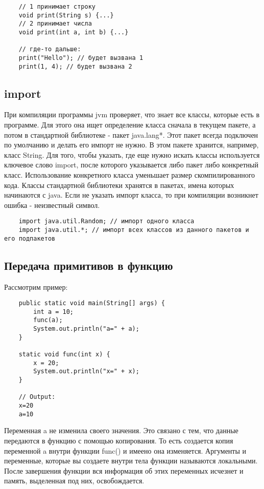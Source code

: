 \begin{lstlisting}
	// 1 принимает строку
	void print(String s) {...}
	// 2 принимает числа
	void print(int a, int b) {...}

	// где-то дальше:
	print("Hello"); // будет вызвана 1
	print(1, 4); // будет вызвана 2
\end{lstlisting}

\subsection*{import}
При компиляции программы jvm проверяет, что знает все классы, которые есть в программе. Для этого она ищет определение класса сначала в текущем пакете, а потом в стандартной библиотеке - пакет java.lang*. Этот пакет всегда подключен по умолчанию и делать его импорт не нужно. В этом пакете хранится, например, класс String.
Для того, чтобы указать, где еще нужно искать классы используется ключевое слово import, после которого указывается либо пакет либо конкретный класс. Использование конкретного класса уменьшает размер скомпилированного кода. Классы стандартной библиотеки хранятся в пакетах, имена которых начинаются с java. Если не указать импорт класса, то при компиляции возникнет ошибка - неизвестный символ.

\begin{lstlisting}
	import java.util.Random; // импорт одного класса
	import java.util.*; // импорт всех классов из данного пакетов и его подпакетов
\end{lstlisting}

\subsection*{Передача примитивов в функцию}

Рассмотрим пример:
\begin{lstlisting}
	public static void main(String[] args) {
		int a = 10;
		func(a);
		System.out.println("a=" + a);
	}

	static void func(int x) {
		x = 20;
		System.out.println("x=" + x);
	}

	// Output:
	x=20
	a=10
\end{lstlisting}

Переменная a не изменила своего значения. Это связано с тем, что данные передаются в функцию с помощью копирования. То есть создается копия переменной a внутри функции func() и имеено она изменяется. Аргументы и переменные, которые вы создаете внутри тела функции называются локальными. После завершения функции вся информация об этих переменных исчезнет и память, выделенная под них, освобождается. 

